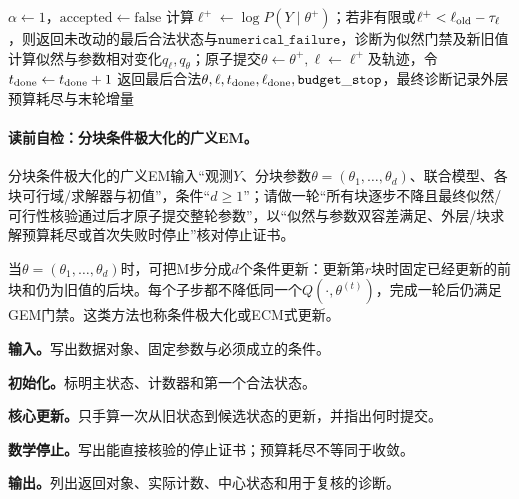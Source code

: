 \begin{AlgorithmContract}
\begin{algorithm}[H]
{  $\alpha\leftarrow1$，$\mathrm{accepted}\leftarrow\mathrm{false}$\;
  计算$\ell^+\leftarrow\log P(Y\mid\theta^+)$；若非有限或$\ell^+<\ell_{\rm old}-\tau_\ell$，则返回未改动的最后合法状态与$\mathtt{numerical\_failure}$，诊断为似然门禁及新旧值\;
  计算似然与参数相对变化$q_\ell,q_\theta$；原子提交$\theta\leftarrow\theta^+,\ell\leftarrow\ell^+$及轨迹，令$t_{\rm done}\leftarrow t_{\rm done}+1$\;
}
返回最后合法$\theta,\ell,t_{\rm done},\ell_{\rm done},\mathtt{budget\_stop}$，最终诊断记录外层预算耗尽与末轮增量\;
\end{algorithm}
\end{AlgorithmContract}

\paragraph{读前自检：分块条件极大化的广义EM。}分块条件极大化的广义EM输入“观测$Y$、分块参数$\theta=(\theta_1,\ldots,\theta_d)$、联合模型、各块可行域/求解器与初值”，条件“$d\ge1$”；请做一轮“所有块逐步不降且最终似然/可行性核验通过后才原子提交整轮参数”，以“似然与参数双容差满足、外层/块求解预算耗尽或首次失败时停止”核对停止证书。\par

当$\theta=(\theta_1,\ldots,\theta_d)$时，可把M步分成$d$个条件更新：更新第$r$块时固定已经更新的前块和仍为旧值的后块。每个子步都不降低同一个$Q(\cdot,\theta^{(t)})$，完成一轮后仍满足GEM门禁。这类方法也称条件极大化或ECM式更新。


\begin{keypointbox}[title={逐参数块条件极大化的GEM：五步阅读}]
\textbf{输入。}写出数据对象、固定参数与必须成立的条件。\par
\textbf{初始化。}标明主状态、计数器和第一个合法状态。\par
\textbf{核心更新。}只手算一次从旧状态到候选状态的更新，并指出何时提交。\par
\textbf{数学停止。}写出能直接核验的停止证书；预算耗尽不等同于收敛。\par
\textbf{输出。}列出返回对象、实际计数、中心状态和用于复核的诊断。
\end{keypointbox}

